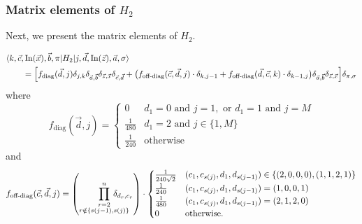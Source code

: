\documentclass[../thesis-main/thesis-main]{subfiles}
\begin{document}
\subsubsection{Matrix elements of $H_2$}
Next, we present the matrix elements of $H_2$.

\begin{mdframed}[frametitle=Matrix elements of $H_{2}$]
\begin{align}
&\langle k,\vec{c},\operatorname{In}(\vec{x}),\vec{b},\pi|H_{2}|j,\vec{d},\operatorname{In}(\vec{z}),\vec{a},\sigma\rangle \nonumber\\
& \qquad=\Big[f_{\mathrm{diag}}(\vec{d},j)\delta_{j,k}\delta_{\vec{a},\vec{b}}\delta_{\vec{z},\vec{x}}\delta_{\vec{c},\vec{d}}
  +\big(f_{\textrm{off-diag}}(\vec{c},\vec{d},j)\cdot\delta_{k,j-1}+f_{\textrm{off-diag}}(\vec{d},\vec{c},k)\cdot\delta_{k-1,j}\big)\delta_{\vec{a},\vec{b}}\delta_{\vec{z},\vec{x}}\Big]\delta_{\pi,\sigma}\label{eq:H2_formula_with_f}
\end{align}
where
\begin{equation}
f_{\mathrm{diag}}(\vec{d},j)=\begin{cases}
0 & d_{1}=0\text{ and }j=1,\text{ or }d_{1}=1\text{ and }j=M\\
\frac{1}{480} & d_{1}=2\text{ and }j\in\{1,M\}\\
\frac{1}{240} & \text{otherwise}
\end{cases}\label{eq:H2_diag_goodbasis-1}
\end{equation}
and 
\begin{equation}
f_{\textrm{off-diag}}(\vec{c},\vec{d},j)=\left(
\prod_{\substack{r=2\\r\notin\{s(j-1),s(j)\}}}^n \mkern-36mu\delta_{d_{r},c_{r}}\right)\cdot\begin{cases}
\frac{1}{240\sqrt{2}} & (c_{1},c_{s(j)},d_{1},d_{s(j-1)})\in\{(2,0,0,0),(1,1,2,1)\}\\
\frac{1}{240} & (c_{1},c_{s(j)},d_{1},d_{s(j-1)})=(1,0,0,1)\\
\frac{1}{480} & (c_{1},c_{s(j)},d_{1},d_{s(j-1)})=(2,1,2,0)\\
0 & \text{otherwise.}
\end{cases}\label{eq:H2_offdiag_goodbasis-1}
\end{equation}
\end{mdframed}
\end{document}
